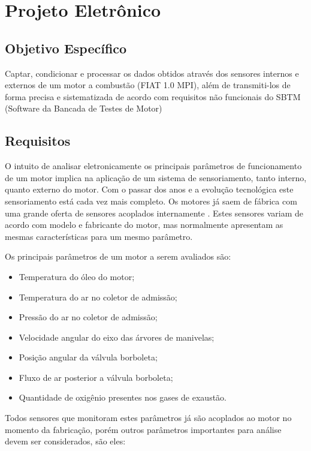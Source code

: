 \chapter[Projeto Eletrônico]{Projeto Eletrônico}

\section{Objetivo Específico}

Captar, condicionar e processar os dados obtidos através dos sensores internos e externos de um motor a combustão (FIAT 1.0 MPI), além de transmiti-los de forma precisa e sistematizada de acordo com requisitos não funcionais do SBTM (Software da Bancada de Testes de Motor)

\section{Requisitos}

O intuito de analisar eletronicamente os principais parâmetros de funcionamento de um motor implica na aplicação de um sistema de sensoriamento, tanto interno, quanto externo do motor. Com o passar dos anos e a evolução tecnológica este sensoriamento está cada vez mais completo. Os motores já saem de fábrica com uma grande oferta de sensores acoplados internamente \cite{valle2004mapping}. Estes sensores variam de acordo com modelo e fabricante do motor, mas normalmente apresentam as mesmas características para um mesmo parâmetro.

Os principais parâmetros de um motor a serem avaliados são:

\begin{itemize}
	\item Temperatura do óleo do motor;
	\item Temperatura do ar no coletor de admissão;
	\item Pressão do ar no coletor de admissão;
	\item Velocidade angular do eixo das árvores de manivelas;
	\item Posição angular da válvula borboleta;
	\item Fluxo de ar posterior a válvula borboleta;
	\item Quantidade de oxigênio presentes nos gases de exaustão.
\end{itemize}

Todos sensores que monitoram estes parâmetros já são acoplados ao motor no momento da fabricação, porém outros parâmetros importantes para análise devem ser considerados, são eles:

